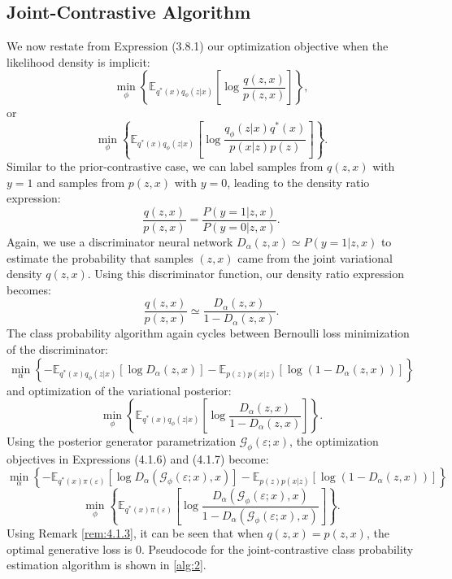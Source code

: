 \documentclass[honours,12pt, twoside]{unswthesis}
\numberwithin{equation}{section}
\theoremstyle{definition}
\begin{document}
\subsection{Joint-Contrastive Algorithm}\label{sec:4.1.3}
We now restate from Expression (3.8.1) our optimization objective when the likelihood density is implicit:
\[\min_\phi \left\lbrace\mathbb{E}_{q^*(x)q_\phi(z|x)}\left[\log \frac{q(z,x)}{p(z,x)}\right]\right\rbrace,\]
or
\[\min_\phi \left\lbrace\mathbb{E}_{q^*(x)q_\phi(z|x)}\left[\log \frac{q_\phi(z|x)q^*(x)}{p(x|z)p(z)}\right]\right\rbrace.\]
Similar to the prior-contrastive case, we can label samples from $q(z,x)$ with $y=1$ and samples from $p(z,x)$ with $y=0$, leading to the density ratio expression:
\[\frac{q(z,x)}{p(z,x)}=\frac{P(y=1|z,x)}{P(y=0|z,x)}.\]
Again, we use a discriminator neural network $D_\alpha(z,x)\simeq P(y=1|z,x)$ to estimate the probability that samples $(z,x)$ came from the joint variational density $q(z,x)$. Using this discriminator function, our density ratio expression becomes:
\[\frac{q(z,x)}{p(z,x)}\simeq\frac{D_\alpha(z,x)}{1-D_\alpha(z,x)}.\]
The class probability algorithm again cycles between Bernoulli loss minimization of the discriminator:
\begin{equation}
\min_\alpha \left\lbrace-\mathbb{E}_{q^*(x)q_\phi(z|x)}[\log D_\alpha(z,x)]-\mathbb{E}_{p(z)p(x|z)}[\log (1-D_\alpha(z,x))]\right\rbrace
\end{equation}
and optimization of the variational posterior:
\begin{equation}
\min_\phi \left\lbrace\mathbb{E}_{q^*(x)q_\phi(z|x)}\left[\log\frac{D_\alpha(z,x)}{1-D_\alpha(z,x)}\right]\right\rbrace.
\end{equation}
Using the posterior generator parametrization $\mathcal{G}_\phi (\varepsilon;x)$, the optimization objectives in Expressions (4.1.6) and (4.1.7) become:
\[\min_\alpha \left\lbrace-\mathbb{E}_{q^*(x)\pi(\varepsilon)}[\log D_\alpha(\mathcal{G}_\phi(\varepsilon;x), x)]-\mathbb{E}_{p(z)p(x|z)}[\log (1-D_\alpha(z,x))]\right\rbrace\]
\[\min_\phi \left\lbrace\mathbb{E}_{q^*(x)\pi(\varepsilon)}\left[\log\frac{D_\alpha(\mathcal{G}_\phi(\varepsilon;x),x)}{1-D_\alpha(\mathcal{G}_\phi(\varepsilon;x),x)}\right]\right\rbrace.\]
Using Remark \ref{rem:4.1.3}, it can be seen that when $q(z,x)=p(z,x)$, the optimal generative loss is $0$. Pseudocode for the joint-contrastive class probability estimation algorithm is shown in \autoref{alg:2}.
\newpage
\end{document}
